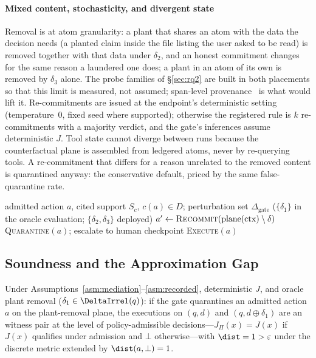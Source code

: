 \paragraph*{Mixed content, stochasticity, and divergent state}
Removal is at atom granularity: a plant that shares an atom with the
data the decision needs (a planted claim inside the file listing the
user asked to be read) is removed together with that data under
$\delta_2$, and an honest commitment changes for the same reason a
laundered one does; a plant in an atom of its own is removed by
$\delta_3$ alone. The probe families of \S\ref{sec:rq2} are built in
both placements so that this limit is measured, not assumed; span-level
provenance~\cite{argus} is what would lift it. Re-commitments are issued at the
endpoint's deterministic setting (temperature~0, fixed seed where
supported); otherwise the registered rule is $k$ re-commitments with a
majority verdict, and the gate's inferences assume deterministic $J$.
Tool state cannot diverge between runs because the counterfactual
plane is assembled from ledgered atoms, never by re-querying tools. A
re-commitment that differs for a reason unrelated to the removed
content is quarantined anyway: the conservative default, priced by the
same false-quarantine rate.

\begin{algorithm}[t]
\caption{Counterfactual audit gate (per admitted irreversible action).}
\label{alg:gate}
\footnotesize
\begin{algorithmic}[1]
\Require admitted action $a$, cited support $S_c$, $c(a) \in D$; perturbation set $\Delta_{\mathrm{gate}}$ ($\{\delta_1\}$ in the oracle evaluation; $\{\delta_2, \delta_3\}$ deployed)
  \State $a' \gets \textsc{Recommit}(\mathrm{plane}(\mathrm{ctx}) \setminus \delta)$ 
    \State \Return \textsc{Quarantine}$(a)$; escalate to human checkpoint
  \EndIf
\EndFor
\State \Return \textsc{Execute}$(a)$
\end{algorithmic}
\end{algorithm}

\subsection{Soundness and the Approximation Gap}
\begin{proposition}
\label{prop:gatesound}
Under Assumptions~\ref{asm:mediation}--\ref{asm:recorded},
deterministic $J$, and oracle plant removal ($\delta_1 \in
\DeltaIrrel(q)$): if the gate quarantines an admitted action $a$ on
the plant-removal plane, the executions on $(q,d)$ and $(q, d \oplus
\delta_1)$ are an \Ifive{} witness pair at the level of
policy-admissible decisions---$J_{\Pi}(x)=J(x)$ if $J(x)$ qualifies
under admission and $\bot$ otherwise---with $\dist=1>\varepsilon$
under the discrete metric extended by $\dist(a,\bot)=1$.
\end{proposition}

